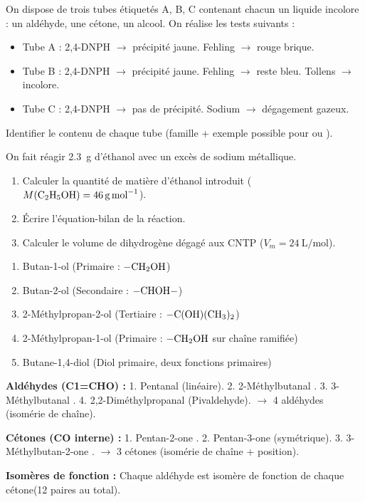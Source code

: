\documentclass[11pt]{article}
\begin{document}
\begin{exercice}
On dispose de trois tubes étiquetés A, B, C contenant chacun un liquide incolore : un aldéhyde, une cétone, un alcool. On réalise les tests suivants :
\begin{itemize}
\item Tube A : 2,4-DNPH $\rightarrow$ précipité jaune. Fehling $\rightarrow$ rouge brique.
\item Tube B : 2,4-DNPH $\rightarrow$ précipité jaune. Fehling $\rightarrow$ reste bleu. Tollens $\rightarrow$ incolore.
\item Tube C : 2,4-DNPH $\rightarrow$ pas de précipité. Sodium $\rightarrow$ dégagement gazeux.
\end{itemize}
Identifier le contenu de chaque tube (famille + exemple possible pour  ou ).
\end{exercice}

\begin{exercice}
On fait réagir \SI{2,3}{\gram} d'éthanol avec un excès de sodium métallique.
\begin{enumerate}
\item Calculer la quantité de matière d'éthanol introduit ($M(\ce{C2H5OH}) = \SI{46}{\gram\per\mol}$).
\item Écrire l'équation-bilan de la réaction.
\item Calculer le volume de dihydrogène dégagé aux CNTP ($V_m = \SI{24}{\liter\per\mol}$).
\end{enumerate}
\end{exercice}

\begin{corrige}
\begin{enumerate}
\item Butan-1-ol (Primaire : $\ce{-CH2OH}$)
\item Butan-2-ol (Secondaire : $\ce{-CHOH-}$)
\item 2-Méthylpropan-2-ol (Tertiaire : $\ce{-C(OH)(CH3)2}$)
\item 2-Méthylpropan-1-ol (Primaire : $\ce{-CH2OH}$ sur chaîne ramifiée)
\item Butane-1,4-diol (Diol primaire, deux fonctions primaires)
\end{enumerate}
\end{corrige}

\begin{corrige}
\textbf{Aldéhydes (C1=CHO) :}
1. Pentanal  (linéaire).
2. 2-Méthylbutanal .
3. 3-Méthylbutanal .
4. 2,2-Diméthylpropanal  (Pivaldehyde).
$\rightarrow$ 4 aldéhydes (isomérie de chaîne).

\textbf{Cétones (CO interne) :}
1. Pentan-2-one .
2. Pentan-3-one  (symétrique).
3. 3-Méthylbutan-2-one .
$\rightarrow$ 3 cétones (isomérie de chaîne + position).

\textbf{Isomères de fonction :} Chaque aldéhyde est isomère de fonction de chaque cétone(12 paires au total).
\end{corrige}
\end{document}
